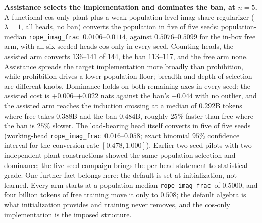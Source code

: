\documentclass[11pt]{article}
\newcommand{\rif}{\texttt{rope\_imag\_frac}\xspace}
\begin{document}
\textbf{Assistance selects the implementation and dominates the ban, at $n{=}5$.} A functional cos-only plant
plus a weak population-level imag-share regularizer ($\lambda{=}1$, all heads, no ban) converts the population in
five of five seeds: population-median \rif\ $0.0106$--$0.0114$, against $0.5076$--$0.5099$ for the in-box free
arm, with all six seeded heads cos-only in every seed. Counting heads, the assisted arm converts $136$--$141$ of
$144$, the ban $113$--$117$, and the free arm none. Assistance spreads the target implementation more broadly
than prohibition, while prohibition drives a lower population floor; breadth and depth of selection are different
knobs. Dominance holds on both remaining axes in every seed: the assisted cost is $+0.006$--$+0.022$ nats against
the ban's $+0.044$ with no outlier, and the assisted arm reaches the induction crossing at a median of $0.292$B
tokens where free takes $0.388$B and the ban $0.484$B, roughly $25\%$ faster than free where the ban is $25\%$
slower. The load-bearing head itself converts in five of five seeds (working-head \rif\ $0.016$--$0.058$; exact
binomial $95\%$ confidence interval for the conversion rate $[0.478,1.000]$). Earlier two-seed pilots with two
independent plant constructions showed the same population selection and dominance; the five-seed campaign brings
the per-head statement to statistical grade. One further fact belongs here: the default is set at initialization,
not learned. Every arm starts at a population-median \rif\ of $0.5000$, and four billion tokens of free training
move it only to $0.508$; the default algebra is what initialization provides and training never removes, and the
cos-only implementation is the imposed structure.
\end{document}
